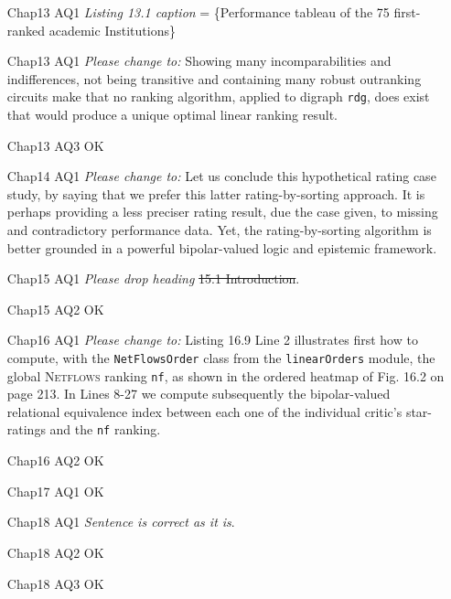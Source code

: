 \documentclass[english]{article}
\begin{document}
\begin{itemize}
\vspace{\baselineskip}
\item [Chap13 AQ1] \emph{Listing 13.1 caption} = \{Performance tableau of the 75 first-ranked academic Institutions\} 
\item [Chap13 AQ1] \emph{Please change to:} Showing many incomparabilities and indifferences, not being transitive and containing many robust outranking circuits make that no ranking algorithm, applied to digraph \texttt{rdg}, does exist that would produce a unique optimal linear ranking result.
\item [Chap13 AQ3] OK

\vspace{\baselineskip}
\item [Chap14 AQ1] \emph{Please change to:} Let us conclude this hypothetical rating case study, by saying that we prefer this latter rating-by-sorting approach. It is perhaps providing a less preciser rating result, due the case given, to missing and contradictory performance data. Yet, the rating-by-sorting algorithm is better grounded in a powerful bipolar-valued logic and epistemic framework.

\vspace{\baselineskip}
\item [Chap15 AQ1] \emph{Please drop heading} \st{15.1 Introduction}.  
\item [Chap15 AQ2] OK

\vspace{\baselineskip}
\item [Chap16 AQ1] \emph{Please change to:} Listing 16.9 Line 2 illustrates first how to compute, with the \texttt{NetFlowsOrder} class from the \texttt{linearOrders} module, the global \textsc{Netflows} ranking \texttt{nf}, as shown in the ordered heatmap of Fig. 16.2 on page 213. In Lines 8-27 we compute subsequently the bipolar-valued relational equivalence index between each one of the individual critic’s star-ratings and the \texttt{nf} ranking. 
\item [Chap16 AQ2] OK

\vspace{\baselineskip}
\item [Chap17 AQ1] OK 

\vspace{\baselineskip}
\item [Chap18 AQ1] \emph{Sentence is correct as it is}. 
\item [Chap18 AQ2] OK
\item [Chap18 AQ3] OK


\end{itemize}
\end{document}
